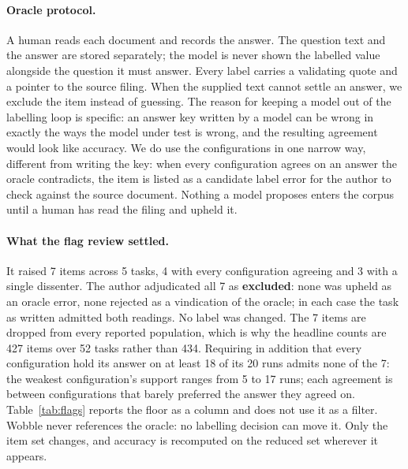 \documentclass[11pt]{article}
\begin{document}
\paragraph{Oracle protocol.} A human reads each document and records the answer. The question text
and the answer are stored separately; the model is never shown the labelled value alongside the
question it must answer. Every label carries a validating quote and a pointer to the source filing.
When the supplied text cannot settle an answer, we exclude the item instead of guessing.
The reason for keeping a model out of the labelling loop is specific: an answer key written by a
model can be wrong in exactly the ways the model under test is wrong, and the resulting agreement
would look like accuracy. We do use the configurations in one narrow way, different from writing
the key: when every configuration agrees on an answer the oracle contradicts, the item is listed
as a candidate label error for the author to check against the source document. Nothing a model
proposes enters the corpus until a human has read the filing and upheld it.

\paragraph{What the flag review settled.} It raised 7 items across 5 tasks, 4 with every
configuration agreeing and 3 with a single dissenter. The author adjudicated all 7 as
\textbf{excluded}: none was upheld as an oracle error, none rejected as a vindication of the
oracle; in each case the task as written admitted both readings. No label was changed. The 7 items
are dropped from every reported population, which is why the headline counts are 427 items over 52
tasks rather than 434. Requiring in addition that every configuration hold its answer on at least
18 of its 20 runs admits none of the 7: the weakest configuration's support ranges from 5 to 17
runs; each agreement is between configurations that barely preferred the answer they agreed on.
Table~\ref{tab:flags} reports the floor as a column and does not use it as a filter. Wobble never
references the oracle: no labelling decision can move it. Only the item set changes, and
accuracy is recomputed on the reduced set wherever it appears.
\end{document}

